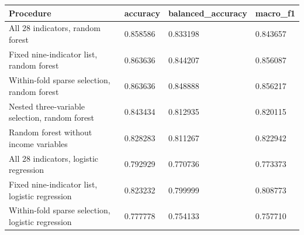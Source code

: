 \begin{tabular}{llll}
\hline
Procedure & accuracy & balanced\_accuracy & macro\_f1 \\
\hline
All 28 indicators, random forest & 0.858586 & 0.833198 & 0.843657 \\
Fixed nine-indicator list, random forest & 0.863636 & 0.844207 & 0.856087 \\
Within-fold sparse selection, random forest & 0.863636 & 0.848888 & 0.856217 \\
Nested three-variable selection, random forest & 0.843434 & 0.812935 & 0.820115 \\
Random forest without income variables & 0.828283 & 0.811267 & 0.822942 \\
All 28 indicators, logistic regression & 0.792929 & 0.770736 & 0.773373 \\
Fixed nine-indicator list, logistic regression & 0.823232 & 0.799999 & 0.808773 \\
Within-fold sparse selection, logistic regression & 0.777778 & 0.754133 & 0.757710 \\
\hline
\end{tabular}
